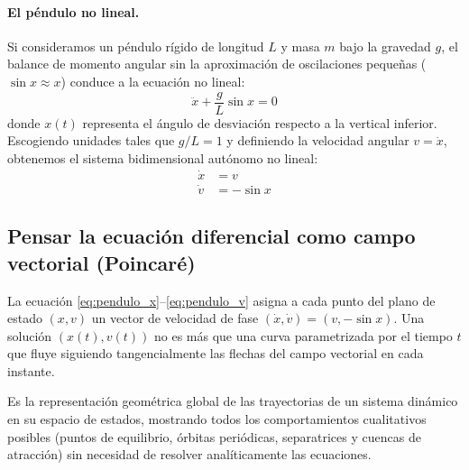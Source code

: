 \paragraph{El péndulo no lineal.}
Si consideramos un péndulo rígido de longitud $L$ y masa $m$ bajo la gravedad $g$, el balance de momento angular sin la aproximación de oscilaciones pequeñas ($\sin x \approx x$) conduce a la ecuación no lineal:
\begin{equation}
    \ddot{x} + \frac{g}{L} \sin x = 0
\end{equation}
donde $x(t)$ representa el ángulo de desviación respecto a la vertical inferior. Escogiendo unidades tales que $g/L = 1$ y definiendo la velocidad angular $v = \dot{x}$, obtenemos el sistema bidimensional autónomo no lineal:
\begin{align}
    \dot{x} &= v \label{eq:pendulo_x}\\
    \dot{v} &= -\sin x \label{eq:pendulo_v}
\end{align}

\subsection{Pensar la ecuación diferencial como campo vectorial (Poincaré)}

La ecuación \eqref{eq:pendulo_x}--\eqref{eq:pendulo_v} asigna a cada punto del plano de estado $(x, v)$ un vector de velocidad de fase $(\dot{x}, \dot{v}) = (v, -\sin x)$. Una solución $(x(t), v(t))$ no es más que una curva parametrizada por el tiempo $t$ que fluye siguiendo tangencialmente las flechas del campo vectorial en cada instante.

\begin{definition}
    Es la representación geométrica global de las trayectorias de un sistema dinámico en su espacio de estados, mostrando todos los comportamientos cualitativos posibles (puntos de equilibrio, órbitas periódicas, separatrices y cuencas de atracción) sin necesidad de resolver analíticamente las ecuaciones.
\end{definition}

